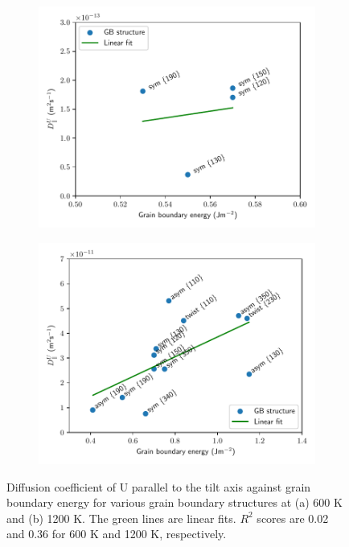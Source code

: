 \documentclass{elsarticle}
\providecommand{\DIFadd}[1]{{\protect\color{blue} \sf #1}} %
\providecommand{\DIFaddend}{} %
\providecommand{\DIFaddFL}[1]{\DIFadd{#1}} %
\begin{document}
\begin{appendices}
\begin{figure}[!ht]
    \centering
    \begin{subfigure}{0.49\textwidth}
        \centering
        \caption{}
        \includegraphics[width=\textwidth]{DvsGBE_600K.pdf}
    \end{subfigure}
    \begin{subfigure}{0.49\textwidth}
        \centering
        \caption{}
        \includegraphics[width=\textwidth]{DvsGBE_1200K.pdf}
    \end{subfigure}
\caption{\DIFaddFL{Diffusion coefficient of U parallel to the tilt axis against grain boundary energy for various grain boundary structures at (a) 600 K and (b) 1200 K. The green lines are linear fits. $R^2$ scores are 0.02 and 0.36 for 600 K and 1200 K, respectively.}}
\label{fig:DvsGBE}
\end{figure}
\DIFaddend 

\end{appendices}


\FloatBarrier


\end{document}
